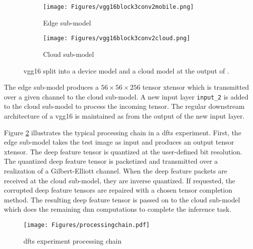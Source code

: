\begin{figure}[H]
	\centering
	\begin{subfigure}{0.48\textwidth}
		\centering
		\texttt{[image: Figures/vgg16block3conv2mobile.png]}
		\caption[VGG16 edge model example]{Edge sub-model}
	\end{subfigure}
\hfill
\begin{subfigure}{0.48\textwidth}
	\centering
	\texttt{[image: Figures/vgg16block3conv2cloud.png]}
	\caption[VGG16 cloud model]{Cloud sub-model}
\end{subfigure}
\caption[VGG16 edge and cloud models]{\gls{vgg16} split into a device model and a cloud model at the output of \vggblock.}
\label{fig:expts:split:vgg:arch}
\end{figure}

The edge sub-model produces a $56 \times 56 \times 256$ tensor \gls{xtensor} which is transmitted over a given channel to the cloud sub-model. A new input layer \verb|input_2| is added to the cloud sub-model to process the incoming tensor. The regular downstream architecture of a \gls{vgg16} is maintained as from the output of the new input layer.

Figure \ref{fig:expt:chain} illustrates the typical processing chain in a \gls{dfts} experiment. First, the edge sub-model takes the test image as input and produces an output tensor \gls{xtensor}. The deep feature tensor is quantized at the user-defined bit resolution. The quantized deep feature tensor is packetized and transmitted over a realization of a Gilbert-Elliott channel. When the deep feature packets are received at the cloud sub-model, they are inverse quantized. If requested, the corrupted deep feature tensors are repaired with a chosen tensor completion method. The resulting deep feature tensor is passed on to the cloud sub-model which does the remaining \gls{dnn} computations to complete the inference task.

\begin{figure}[H]
	\centering
	\texttt{[image: Figures/processingchain.pdf]}
	\caption{\gls{dfts} experiment processing chain}
	\label{fig:expt:chain}
\end{figure}

